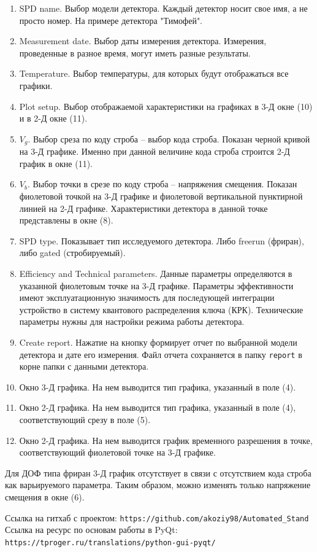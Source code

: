 \documentclass[12pt]{article}
\begin{document}
\begin{enumerate}
   \item SPD name. Выбор модели детектора. Каждый детектор носит свое имя, а не просто номер. На примере детектора "Тимофей".
   \item Measurement date. Выбор даты измерения детектора. Измерения, проведенные в разное время, могут иметь разные результаты. 
   \item Temperature. Выбор температуры, для которых будут отображаться все графики.
   \item Plot setup. Выбор  отображаемой характеристики на  графиках в 3-Д окне  (10) и в 2-Д окне (11).
   \item $V_g$. Выбор среза по коду строба -- выбор кода строба. Показан черной кривой на 3-Д графике. Именно при данной величине кода строба строится 2-Д график в окне (11).
   \item $V_b$. Выбор точки в срезе по коду строба -- напряжения смещения. Показан фиолетовой точкой на 3-Д графике и фиолетовой вертикальной пунктирной линией  на 2-Д графике. Характеристики детектора в данной точке представлены в окне (8).
   \item SPD type. Показывает тип исследуемого детектора. Либо freerun (фриран), либо gated (стробируемый).
   \item Efficiency and Technical parameters. Данные параметры определяются в указанной фиолетовым точке на 3-Д графике.  Параметры эффективности имеют эксплуатационную значимость для последующей интеграции устройство в систему квантового распределения ключа (КРК). Технические параметры нужны для настройки режима работы детектора. 
   \item Create report. Нажатие на кнопку формирует отчет по выбранной модели детектора и дате его измерения. Файл отчета сохраняется в папку \verb|report| в корне папки с данными детектора. 
   \item Окно 3-Д графика. На нем выводится тип графика, указанный в поле (4).
   \item Окно 2-Д графика. На нем выводится тип графика, указанный в поле (4), соответствующий срезу в поле (5).
   \item Окно 2-Д графика. На нем выводится график временного разрешения в точке, соответствующий фиолетовой точке на 3-Д графике.
\end{enumerate}

Для ДОФ типа фриран 3-Д график отсутствует в связи с отсутствием кода строба как варьируемого параметра. Таким образом, можно изменять только напряжение смещения в окне (6).




\begin{thebibliography}{}
    Ссылка на гитхаб с проектом: \verb|https://github.com/akoziy98/Automated_Stand|
    Ссылка на ресурс по основам работы в PyQt: \verb|https://tproger.ru/translations/python-gui-pyqt/|
\end{thebibliography}
\end{document}
